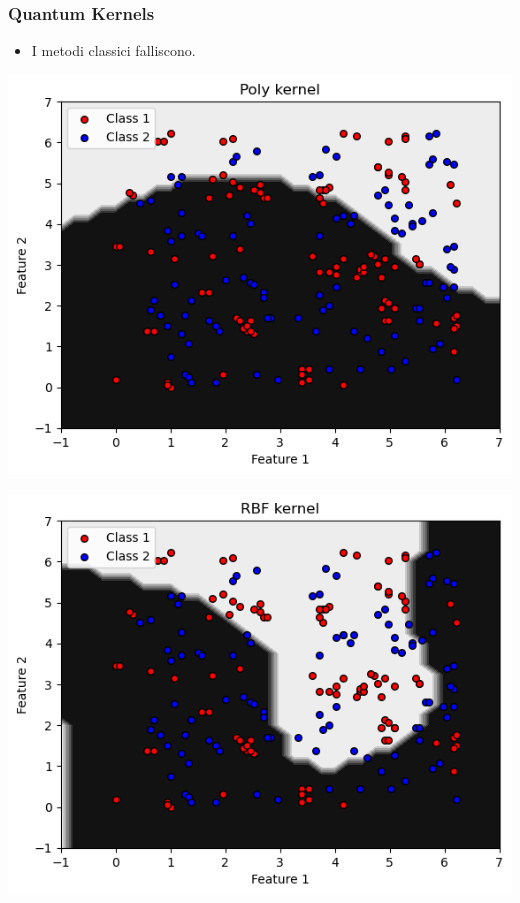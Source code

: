 \documentclass{beamer}
\begin{document}
\begin{frame}
  \frametitle{Quantum Kernels}
  \begin{itemize}
    \item I metodi classici falliscono.
  \end{itemize}
    \vspace{0.8cm}
    \begin{minipage}{0.5\textwidth}
       \centering
       \includegraphics[width=\textwidth]{images/adhocpoly.png}
   \end{minipage}%
   \begin{minipage}{0.5\textwidth}
       \centering
       \includegraphics[width=\textwidth]{images/adhocrbf.png}
   \end{minipage}
\end{frame}
\end{document}
